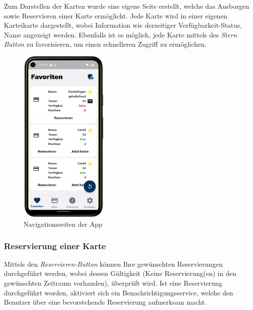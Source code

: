Zum Darstellen der Karten wurde eine eigene Seite erstellt, welche das Ausborgen sowie Reservieren einer Karte ermöglicht. Jede Karte wird in einer eigenen Karteikarte dargestellt, wobei Information wie derzeitiger Verfügbarkeit-Status, Name angezeigt werden. Ebenfalls ist es möglich, jede Karte mittels des {\textit{Stern Button}} zu favorisieren, um einen schnelleren Zugriff zu ermöglichen. 
\begin{figure}[h!]
\centering
    \includegraphics[width=0.39\textwidth]{FLUTTER/images/GP/Client_Karten.png}
    \caption{Navigationsseiten der App}
    \label{fig:navigationsseiten}
\end{figure}
\newpage



\subsubsection{Reservierung einer Karte}


Mittels den {\textit{Reservieren-Button}} können Ihre gewünschten Reservierungen durchgeführt werden, wobei dessen Gültigkeit (Keine Reservierung(en) in den gewünschten Zeitraum vorhanden), überprüft wird. Ist eine Reservierung durchgeführt worden, aktiviert sich ein Benachrichtigungsservice, welche den Benutzer über eine bevorstehende Reservierung aufmerksam macht.


